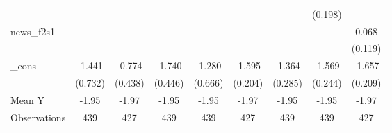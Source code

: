 {\begin{tabular}{l*{8}{c}}
            &                     &                     &                     &                     &                     &                     &     (0.198)         &                     \\
\addlinespace
news\_f2s1   &                     &                     &                     &                     &                     &                     &                     &       0.068         \\
            &                     &                     &                     &                     &                     &                     &                     &     (0.119)         \\
\addlinespace
\_cons      &      -1.441\sym{*}  &      -0.774\sym{*}  &      -1.740\sym{***}&      -1.280\sym{*}  &      -1.595\sym{***}&      -1.364\sym{***}&      -1.569\sym{***}&      -1.657\sym{***}\\
            &     (0.732)         &     (0.438)         &     (0.446)         &     (0.666)         &     (0.204)         &     (0.285)         &     (0.244)         &     (0.209)         \\
\midrule
Mean Y      &       -1.95         &       -1.97         &       -1.95         &       -1.95         &       -1.97         &       -1.95         &       -1.95         &       -1.97         \\
Observations&         439         &         427         &         439         &         439         &         427         &         439         &         439         &         427         \\
\bottomrule
\end{tabular}
}
